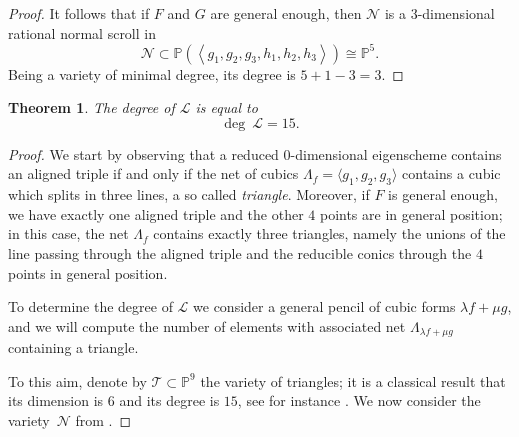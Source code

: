 \documentclass{amsart}
\theoremstyle{plain}
\newtheorem{theorem}[lemma]{Theorem}
\theoremstyle{definition}
\newcommand{\p}{\mathbb{P}}
\newcommand{\comment}[1]{}
\begin{document}
{\begin{proof}
It follows that if $F$ and $G$ are general enough, then $\mathcal{N}$ is a $3$-dimensional rational normal scroll in
\[
\mathcal{N} \subset \p(\left\langle g_1, g_2, g_3, h_1, h_2, h_3 \right\rangle) \cong \p^5.
\]
Being a variety of minimal degree, its degree is $5+1-3 = 3$.
\end{proof}

\begin{theorem}
The degree of $\mathcal L$ is equal to
\[
  \deg \ \mathcal L =  15.
\]
\end{theorem}

\begin{proof}
We start by observing that a reduced $0$-dimensional eigenscheme contains an aligned triple if and only if the net of cubics 
$\Lambda_f = \langle g_1, g_2, g_3 \rangle$ contains a cubic which splits in three lines, a so called \emph{triangle}. Moreover, if $F$ is general enough, we have exactly one aligned triple and the other $4$ points are in general position; in this case, the net $\Lambda_f$ contains exactly three triangles, namely the unions of the line passing through the aligned triple and the reducible conics through the $4$ points in general position.

To determine the degree of $\mathcal L$ we consider a general pencil of cubic forms $\lambda f + \mu g$, and we will compute the number of elements with associated net $\Lambda_{\lambda f + \mu g}$ containing a triangle.

To this aim, denote by ${\mathcal T} \subset \p^9$ the variety of triangles; it is a classical result that its dimension is $6$ and its degree is $15$,
see for instance \cite[Section 2.2.2]{3264}. We now consider the variety~${\mathcal N}$ from .
%
%
%
\comment{
given by the union of the nets of cubics of the pencil
\[
{\mathcal N} = \bigcup_{(\lambda : \mu) \in \p^1} \Lambda_{\lambda f + \mu g} \subset \p^9.
\]
Observe that we can assume that ${\mathcal N}$ is an embedding of a rational projective bundle; indeed, it can be seen as an immersion of the $\p^2$-bundle over $\p^1$ given by the family the planes ${\mathcal P}=
\{\Sigma_{\lambda f + \mu g}\ : \ (\lambda:\mu)\in \p^1\} \subset \p^1 \times \p^9$. The map ${\mathcal P} \to {\mathcal N}$ contracts no subvariety of any plane of ${\mathcal P}$, so it is either an embedding or it contracts some horizontal curve. In the latter case, all the planes of the family should intersect in at least one point. In particular, the two nets $\Sigma_f$ and $\Sigma_g$ should have non-empty intersection.

}
\end{proof}}
\end{document}
